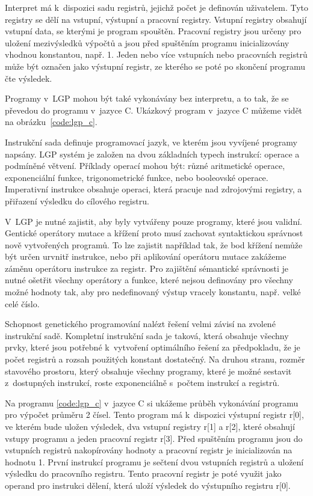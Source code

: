 Interpret má k~dispozici sadu registrů, jejichž počet je definován uživatelem.
Tyto registry se dělí na vstupní, výstupní a pracovní registry.
Vstupní registry obsahují vstupní data, se kterými je program spouštěn.
Pracovní registry jsou určeny pro uložení mezivýsledků výpočtů a jsou před spuštěním programu inicializovány vhodnou konstantou, např. 1.
Jeden nebo více vstupních nebo pracovních registrů může být označen jako výstupní registr, ze kterého se poté po skončení programu čte výsledek.

Programy v~LGP mohou být také vykonávány bez interpretu, a to tak, že se převedou do programu v~jazyce C.
Ukázkový program v~jazyce C můžeme vidět na obrázku~\ref{code:lgp_c}.

Instrukční sada definuje programovací jazyk, ve kterém jsou vyvíjené programy napsány.
LGP systém je založen na dvou základních typech instrukcí: operace a podmíněné větvení.
Příklady operací mohou být: různé aritmetické operace, exponenciální funkce, trigonometrické funkce, nebo booleovské operace.
Imperativní instrukce obsahuje operaci, která pracuje nad zdrojovými registry, a přiřazení výsledku do cílového registru.

V~LGP je nutné zajistit, aby byly vytvářeny pouze programy, které jsou validní.
Gentické operátory mutace a křížení proto musí zachovat syntaktickou správnost nově vytvořených programů.
To lze zajistit například tak, že bod křížení nemůže být určen urvnitř instrukce, nebo při aplikování operátoru mutace zakážeme záměnu operátoru instrukce za registr.
Pro zajištění sémantické správnosti je nutné ošetřit všechny operátory a funkce, které nejsou definovány pro všechny možné hodnoty tak, aby pro nedefinovaný výstup vracely konstantu, např. velké celé číslo.

Schopnost genetického programování nalézt řešení velmi závisí na zvolené instrukční sadě.
Kompletní instrukční sada je taková, která obsahuje všechny prvky, které jsou potřebné k~vytvoření optimálního řešení za předpokladu, že je počet registrů a rozsah použitých konstant dostatečný.
Na druhou stranu, rozměr stavového prostoru, který obsahuje všechny programy, které je možné sestavit z~dostupných instrukcí, roste exponenciálně s~počtem instrukcí a registrů.

Na programu \ref{code:lgp_c} v~jazyce C si ukážeme průběh vykonávání programu pro výpočet průměru 2 čísel.
Tento program má k~dispozici výstupní registr r[0], ve kterém bude uložen výsledek, dva vstupní registry r[1] a r[2], které obsahují vstupy programu a jeden pracovní registr r[3].
Před spuštěním programu jsou do vstupních registrů nakopírovány hodnoty a pracovní registr je inicializován na hodnotu 1.
První instrukcí programu je sečtení dvou vstupních registrů a uložení výsledku do pracovního registru.
Tento pracovní registr je poté využit jako operand pro instrukci dělení, která uloží výsledek do výstupního registru r[0].


